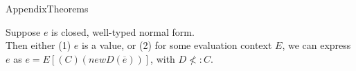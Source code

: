 \documentclass{beamer}
\begin{document}
    \begin{frame}{Appendix}{Theorems}
        \begin{theorem}
            Suppose $e$ is closed, well-typed normal form.\\
            Then either (1) $e$ is a value, or (2) for some evaluation context $E$, we can
            express $e$ as $e = E[(C)(new D(\overline{e}))]$, with $D \nless: C$.
        \end{theorem}
    \end{frame}
\end{document}
